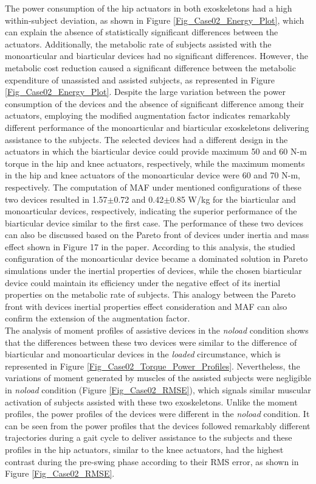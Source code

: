 \documentclass[10pt,letterpaper]{article}
\begin{document}
The power consumption of the hip actuators in both exoskeletons had a high within-subject deviation, as shown in Figure \ref{Fig_Case02_Energy_Plot}, which can explain the absence of statistically significant differences between the actuators.  Additionally, the metabolic rate of subjects assisted with the monoarticular and biarticular devices had no significant differences. However, the metabolic cost reduction caused a significant difference between the metabolic expenditure of unassisted and assisted subjects, as represented in Figure \ref{Fig_Case02_Energy_Plot}.
Despite the large variation between the power consumption of the devices and the absence of significant difference among their actuators, employing the modified augmentation factor indicates remarkably different performance of the monoarticular and biarticular exoskeletons delivering assistance to the subjects. The selected devices had a different design in the actuators in which the biarticular device could provide maximum 50 and 60 N-m torque in the hip and knee actuators, respectively, while the maximum moments in the hip and knee actuators of the monoarticular device were 60 and 70 N-m, respectively. The computation of MAF under mentioned configurations of these two devices resulted in 1.57$\pm$0.72 and 0.42$\pm$0.85 W/kg for the biarticular and monoarticular devices, respectively, indicating the superior performance of the biarticular device similar to the first case. The performance of these two devices can also be discussed based on the Pareto front of devices under inertia and mass effect shown in Figure 17 in the paper. According to this analysis, the studied configuration of the monoarticular device became a dominated solution in Pareto simulations under the inertial properties of devices, while the chosen biarticular device could maintain its efficiency under the negative effect of its inertial properties on the metabolic rate of subjects. This analogy between the Pareto front with devices inertial properties effect consideration and MAF can also confirm the extension of the augmentation factor.\\
The analysis of moment profiles of assistive devices in the {\it noload} condition shows that the differences between these two devices were similar to the difference of biarticular and monoarticular devices in the {\it loaded} circumstance, which is represented in Figure \ref{Fig_Case02_Torque_Power_Profiles}. Nevertheless, the variations of moment generated by muscles of the assisted subjects were negligible in {\it noload} condition (Figure \ref{Fig_Case02_RMSE}), which signals similar muscular activation of subjects assisted with these two exoskeletons. Unlike the moment profiles, the power profiles of the devices were different in the {\it noload} condition. It can be seen from the power profiles that the devices followed remarkably different trajectories during a gait cycle to deliver assistance to the subjects and these profiles in the hip actuators, similar to the knee actuators, had the highest contrast during the pre-swing phase according to their RMS error, as shown in Figure \ref{Fig_Case02_RMSE}.\\
\end{document}
